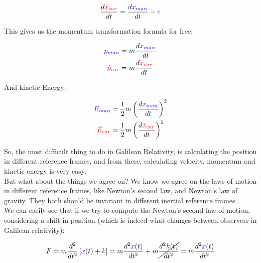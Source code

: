 \begin{align*}
    \frac{d \begingroup\color{red}\tilde{x}_{car}\endgroup}{dt} = \frac{d \begingroup\color{blue}x_{man}\endgroup}{dt} - \begingroup\color{teal}v\endgroup
\end{align*}

This gives us the momentum transformation formula for free:

\begin{align*}
    \begingroup\color{blue}p_{man}\endgroup &= m \frac{d \begingroup\color{blue}x_{man}\endgroup}{dt}\\
    \begingroup\color{red}\tilde{p}_{car}\endgroup &= m \frac{d \begingroup\color{red}\tilde{x}_{car}\endgroup}{dt}
\end{align*}

And kinetic Energy:

\begin{align*}
    \begingroup\color{blue}E_{man}\endgroup &= \frac{1}{2} m \left(\frac{d \begingroup\color{blue}x_{man}\endgroup}{dt}\right)^2\\
    \begingroup\color{red}\tilde{E}_{car}\endgroup &= \frac{1}{2} m \left(\frac{d \begingroup\color{red}\tilde{x}_{car}\endgroup}{dt}\right)^2
\end{align*}

So, the most difficult thing to do in Galilean Relativity, is calculating the position in different reference frames, and from there, calculating 
velocity, momentum and kinetic energy is very easy.\\

But what about the things we agree on? We know we agree on the laws of motion in different reference frames, like Newton's second law, and Newton's law of gravity. They both should
be invariant in different inertial reference frames.\\

We can easily see that if we try to compute the Newton's second law of motion, considering a shift in position (which is indeed what changes between observers in Galilean relativity):

\begin{align*}
    F = m \frac{d^2}{dt^2}\left[\begingroup\color{blue}x\endgroup(t) + \begingroup\color{violet}k\endgroup\right] = m \frac{d^2 \begingroup\color{blue}x\endgroup(t)}{dt^2} + m \cancel{\frac{d^2 \begingroup\color{violet}k\endgroup(t)}{dt^2}} = m \frac{d^2 \begingroup\color{blue}x\endgroup(t)}{dt^2}
\end{align*}

